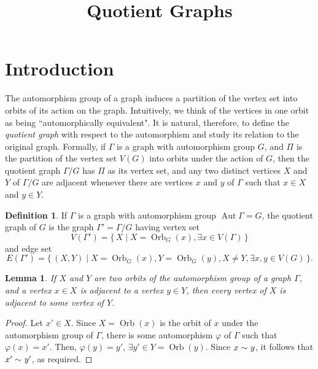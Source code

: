 \documentclass[12pt,a4paper]{amsart}
\title{Quotient Graphs}
\date{}
\newtheorem{Lemma}[Theorem]{Lemma}
\theoremstyle{remark}
\theoremstyle{definition}
\newtheorem{Definition}[Theorem]{Definition}
\newcommand{\adj}[1]{\sim_{\scriptscriptstyle #1}}
\DeclareMathOperator{\aut}{Aut}
\DeclareMathOperator{\orb}{Orb}
\begin{document}
\maketitle

\section{Introduction}
\label{sec:Intro}

The automorphism group of a graph induces a partition of the vertex set into orbits of its action on the graph. Intuitively, we think of the vertices in one orbit as being ``automorphically equivalent". It is natural, therefore, to define the \emph{quotient graph} with respect to the automorphism and study its relation to the original graph. Formally, if $\Gamma$ is a graph with automorphism group $G$, and $\Pi$ is the partition of the vertex set $V(G)$ into orbits under the action of $G$, then the quotient graph $\Gamma/G$ has $\Pi$ as its vertex set, and any two distinct vertices $X$ and $Y$ of $\Gamma/G$ are adjacent whenever there are vertices $x$ and $y$ of $\Gamma$ such that $x \in X$ and $y \in Y$.

\begin{Definition}
If $\Gamma$ is a graph with automorphism group $\aut \Gamma = G$, the quotient graph of $G$ is the graph $\Gamma' = \Gamma/G$ having vertex set
\begin{equation*}
V(\Gamma') = \{\, X \mid X = \orb_G(x), \exists x \in V(\Gamma) \,\}
\end{equation*}
and edge set 
\begin{equation*}
E(\Gamma') = \{\, (X,Y) \mid X = \orb_G(x), Y = \orb_G(y), X \ne Y, \exists x, y \in V(G) \,\}.
\end{equation*}
\end{Definition}

\begin{Lemma}
\label{lem:xy=>x'y'}
If $X$ and $Y$ are two orbits of the automorphism group of a graph $\Gamma$, and a vertex $x \in X$ is adjacent to a vertex $y \in Y$, then every vertex of $X$ is adjacent to some vertex of $Y$.
\end{Lemma}
\begin{proof}
Let $x' \in X$. Since $X = \orb(x)$ is the orbit of $x$ under the automorphism group of $\Gamma$, there is some automorphism $\varphi$ of $\Gamma$ such that $\varphi(x) = x'$. Then, $\varphi(y) = y'$, $\exists y' \in Y = \orb(y)$. Since $x \adj{} y$, it follows that $x' \adj{} y'$, as required.
\end{proof}
\end{document}
